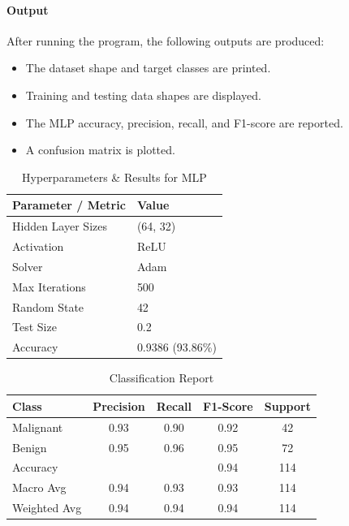 \documentclass[a4paper,11pt]{article}
\begin{document}
\begin{itemize}
\paragraph{Output}
After running the program, the following outputs are produced:
\begin{itemize}
    \item The dataset shape and target classes are printed.
    \item Training and testing data shapes are displayed.
    \item The MLP accuracy, precision, recall, and F1-score are reported.
    \item A confusion matrix is plotted.
\end{itemize}

\begin{table}[H]
\centering
\caption{Hyperparameters \& Results for MLP}
\begin{tabular}{ll}
\toprule
\textbf{Parameter / Metric} & \textbf{Value} \\
\midrule
Hidden Layer Sizes  & (64, 32) \\
Activation          & ReLU \\
Solver              & Adam \\
Max Iterations      & 500 \\
Random State        & 42 \\
Test Size           & 0.2 \\
Accuracy            & 0.9386 (93.86\%) \\
\bottomrule
\end{tabular}
\end{table}

\begin{table}[H]
\centering
\caption{Classification Report}
\begin{tabular}{lcccc}
\toprule
\textbf{Class} & \textbf{Precision} & \textbf{Recall} & \textbf{F1-Score} & \textbf{Support} \\
\midrule
Malignant      & 0.93 & 0.90 & 0.92 & 42 \\
Benign         & 0.95 & 0.96 & 0.95 & 72 \\
\midrule
Accuracy       &      &      & 0.94 & 114 \\
Macro Avg      & 0.94 & 0.93 & 0.93 & 114 \\
Weighted Avg   & 0.94 & 0.94 & 0.94 & 114 \\
\bottomrule
\end{tabular}
\end{table}


\end{itemize}
\end{document}
